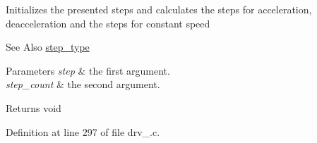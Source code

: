 Initializes the presented steps and calculates the steps for acceleration, deacceleration and the steps for constant speed \begin{DoxySeeAlso}{See Also}
\hyperlink{group__DRV8825_ga3af682b92aa259509aea217f6dc64356}{step\-\_\-type} 
\end{DoxySeeAlso}

\begin{DoxyParams}{Parameters}
{\em step} & the first argument. \\
\hline
{\em step\-\_\-count} & the second argument. \\
\hline
\end{DoxyParams}
\begin{DoxyReturn}{Returns}
void 
\end{DoxyReturn}


Definition at line 297 of file drv\-\_.\-c.


